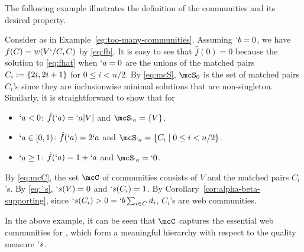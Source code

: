 The following example illustrates the definition of the communities and its desired property.
\begin{example}
  \label{eg:mcC}
  Consider  as in Example~\ref{eg:too-many-communities}. Assuming $`b=0$, we have $f(C)=w(V`/C,C)$ by \eqref{eq:fb}. It is easy to see that $\hat{f}(0)=0$ because the solution to \eqref{eq:fhat} when $`a=0$ are the unions of the matched pairs $C_i:=\{2i,2i+1\}$ for $0\leq i<n/2$. By \eqref{eq:mcS}, $\mcS_0$ is the set of matched pairs $C_i$'s since they are inclusionwise minimal solutions that are non-singleton. Similarly, it is straightforward to show that for
  \begin{itemize}
	  \setlength\itemsep{-.8em}
	  \item $`a<0$: $\hat{f}(`a) = `a\lvert V\rvert$ and $\mcS_{`a}=\Set{V}$.\\
	  \item $`a\in [0,1)$: $\hat{f}(`a) = 2`a$ and $\mcS_{`a}=\Set{C_i\mid 0\leq i< n/2}$.\\
	  \item $`a\geq 1$: $\hat{f}(`a) = 1+`a$ and $\mcS_{`a}=`0$.
  \end{itemize}
  By \eqref{eq:mcC}, the set $\mcC$ of communities consists of $V$ and the matched pairs $C_i$'s. By \eqref{eq:`s}, $`s(V)=0$ and $`s(C_i)=1$. By Corollary~\ref{cor:alpha-beta-supporting}, since $`s(C_i)>0=`b\sum_{i\in C}d_i$, $C_i$'s are web communities. 
\end{example}

In the above example, it can be seen that $\mcC$ captures the essential web communities for , which form a meaningful hierarchy with respect to the quality measure $`s$. 

